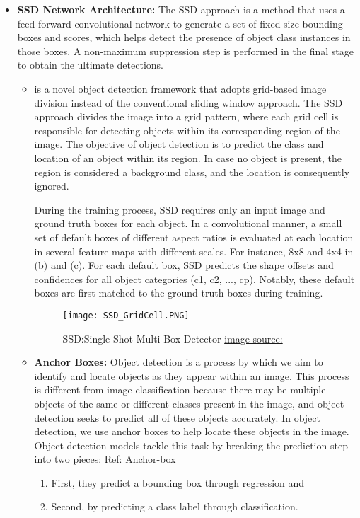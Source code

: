 \begin{itemize}
    \item \textbf{SSD Network Architecture: } The SSD approach is a method that uses a feed-forward convolutional network to generate a set of fixed-size bounding boxes and scores, which helps detect the presence of object class instances in those boxes. A non-maximum suppression step is performed in the final stage to obtain the ultimate detections. \\
    \begin{itemize}
        \item {} is a novel object detection framework that adopts grid-based image division instead of the conventional sliding window approach. The SSD approach divides the image into a grid pattern, where each grid cell is responsible for detecting objects within its corresponding region of the image. The objective of object detection is to predict the class and location of an object within its region. In case no object is present, the region is considered a background class, and the location is consequently ignored.

        During the training process, SSD requires only an input image and ground truth boxes for each object. In a convolutional manner, a small set of default boxes of different aspect ratios is evaluated at each location in several feature maps with different scales. For instance, 8x8 and 4x4 in (b) and (c). For each default box, SSD predicts the shape offsets and confidences for all object categories (c1, c2, ..., cp). Notably, these default boxes are first matched to the ground truth boxes during training.
        \begin{figure}[H]
            \centering
            \texttt{[image: SSD\_GridCell.PNG]}
            \caption{SSD:Single Shot Multi-Box Detector \textcolor{red}{\protect\href{https://arxiv.org/pdf/1512.02325.pdf}{image source: \cite{liu2016ssd}}}}
            \label{fig:SSD_grid}
        \end{figure}
        
        \item \textbf{Anchor Boxes:} Object detection is a process by which we aim to identify and locate objects as they appear within an image. This process is different from image classification because there may be multiple objects of the same or different classes present in the image, and object detection seeks to predict all of these objects accurately. In object detection, we use anchor boxes to help locate these objects in the image.
        Object detection models tackle this task by breaking the prediction step into two pieces: 
        \textcolor{red}{\href{https://blog.roboflow.com/what-is-an-anchor-box/}{Ref: Anchor-box}}
        \begin{enumerate}
            \item First, they predict a bounding box through regression and
            \item Second, by predicting a class label through classification.
        \end{enumerate}
        

\end{itemize}
\end{itemize}
